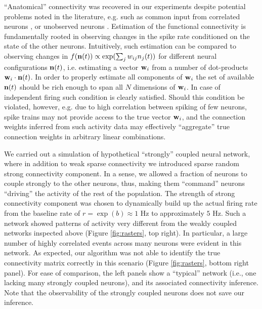 ``Anatomical'' connectivity was recovered in our experiments despite potential problems noted in the literature, e.g. such as common input from correlated neurons \cite{Nykamp05,NYK06}, or unobserved neurons \cite{Vidne08}. %
Estimation of the functional connectivity is fundamentally rooted in observing changes in the spike rate conditioned on the state of the other neurons. Intuitively, such estimation can be compared to observing changes in $f({\bf n}(t))\propto\exp(\sum_j w_{ij}n_j(t))$ for different neural configurations ${\bf n}(t)$, i.e. estimating a vector ${\bf w}_i$ from a number of dot-products ${\bf w}_i\cdot {\bf n}(t)$. In order to properly estimate all components of ${\bf w}_i$ the set of available ${\bf n}(t)$ should be rich enough to span all $N$ dimensions of ${\bf w}_i$. In case of independent firing such condition is clearly satisfied.  Should this condition be violated, however, e.g. due to high correlation between spiking of few neurons, spike trains may not provide access to the true vector ${\bf w}_i$, and the connection weights inferred from such activity data may effectively ``aggregate'' true connection weights in arbitrary linear combinations.

We carried out a simulation of hypothetical ``strongly'' coupled neural network, where in addition to weak sparse connectivity we introduced sparse random strong connectivity component. In a sense, we allowed a fraction of neurons to couple strongly to the other neurons, thus, making them ``command'' neurons ``driving'' the activity of the rest of the population. The strength of strong connectivity component was chosen to dynamically build up the actual firing rate from the baseline rate of $r=\exp(b)\approx 1$ Hz to approximately $5$ Hz. Such a network showed patterns of activity very different from the weakly coupled networks inspected above (Figure \ref{fig:rasters}, top right). In particular, a large number of highly correlated events across many neurons were evident in this network. As expected, our algorithm was not able to identify the true connectivity matrix correctly in this scenario (Figure \ref{fig:rasters}, bottom right panel).  For ease of comparison, the left panels show a ``typical'' network (i.e., one lacking many strongly coupled neurons), and its associated connectivity inference.  Note that the observability of the strongly coupled neurons does not save our inference.

